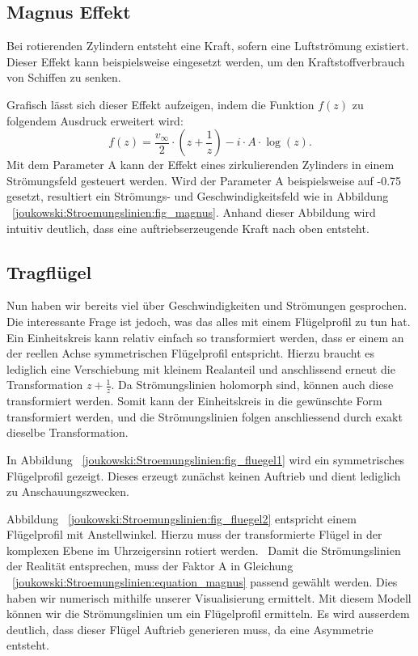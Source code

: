 	\subsection{Magnus Effekt}
		
		 Bei rotierenden Zylindern entsteht eine Kraft, sofern eine Luftströmung existiert. Dieser Effekt kann beispielsweise eingesetzt werden, um den Kraftstoffverbrauch von Schiffen zu senken.
		 
		 Grafisch lässt sich dieser Effekt aufzeigen, indem die Funktion $f(z)$ zu folgendem Ausdruck erweitert wird:
		 \begin{equation}
		 	\label{joukowski:Stroemungslinien:equation_magnus}
		 	 f(z) = \frac{v_\infty}{2} \cdot (z+ \frac{1}{z}) - i\cdot A\cdot \log(z).
		 \end{equation}
		  Mit dem Parameter A kann der Effekt eines zirkulierenden Zylinders in einem Strömungsfeld gesteuert werden. Wird der Parameter A beispielsweise auf -0.75 gesetzt, resultiert ein Strömungs- und Geschwindigkeitsfeld wie in Abbildung ~\eqref{joukowski:Stroemungslinien:fig_magnus}. Anhand dieser Abbildung wird intuitiv deutlich, dass eine auftriebserzeugende Kraft nach oben entsteht.
	 \subsection{Tragflügel}
	 	
	 	
		  Nun haben wir bereits viel über Geschwindigkeiten und Strömungen gesprochen.
		  Die interessante Frage ist jedoch, was das alles mit einem Flügelprofil zu tun hat.
		  Ein Einheitskreis kann relativ einfach so transformiert werden, dass er einem an der reellen Achse symmetrischen Flügelprofil entspricht.
		  Hierzu braucht es lediglich eine Verschiebung mit kleinem Realanteil und anschlissend erneut die Transformation $z + \frac{1}{z}$.
		  Da Strömungslinien holomorph sind, können auch diese transformiert werden.
		  Somit kann der Einheitskreis in die gewünschte Form transformiert werden, und die Strömungslinien folgen anschliessend durch exakt dieselbe Transformation.
		  
		  In Abbildung ~\eqref{joukowski:Stroemungslinien:fig_fluegel1} wird ein symmetrisches Flügelprofil gezeigt. Dieses erzeugt zunächst keinen Auftrieb und dient lediglich zu Anschauungszwecken.
		  
		  Abbildung ~\eqref{joukowski:Stroemungslinien:fig_fluegel2} entspricht einem Flügelprofil mit Anstellwinkel.
		  Hierzu muss der transformierte Flügel in der komplexen Ebene im Uhrzeigersinn rotiert werden.~
		  Damit die Strömungslinien der Realität entsprechen, muss der Faktor A in Gleichung ~\eqref{joukowski:Stroemungslinien:equation_magnus} passend gewählt werden. Dies haben wir numerisch mithilfe unserer Visualisierung ermittelt.
		  Mit diesem Modell können wir die Strömungslinien um ein Flügelprofil ermitteln.
		  Es wird ausserdem deutlich, dass dieser Flügel Auftrieb generieren muss, da eine Asymmetrie entsteht.
	
